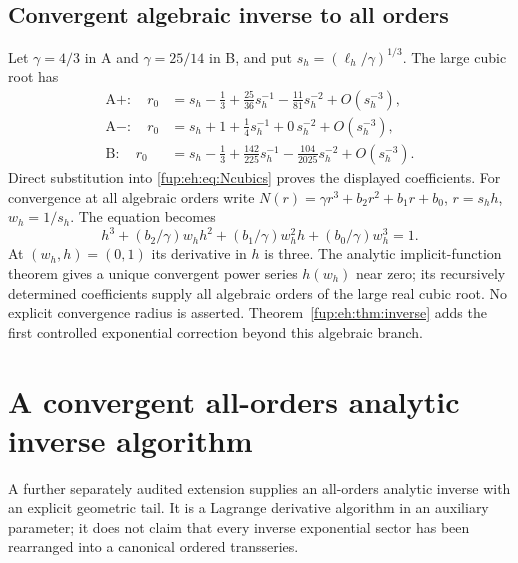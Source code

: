 \documentclass[11pt,letterpaper]{article}
\theoremstyle{definition}\newtheorem{definition}[theorem]{Definition}
\theoremstyle{remark}\newtheorem{remark}[theorem]{Remark}
\begin{document}
\subsection{Convergent algebraic inverse to all orders}
Let $\gamma=4/3$ in A and $\gamma=25/14$ in B, and put
$s_h=(\ell_h/\gamma)^{1/3}$. The large cubic root has
\begin{align*}
 \mathrm A+:\quad r_0&=s_h-\tfrac13+\tfrac{25}{36}s_h^{-1}
                         -\tfrac{11}{81}s_h^{-2}+O(s_h^{-3}),\\
 \mathrm A-:\quad r_0&=s_h+1+\tfrac14s_h^{-1}
                         +0\,s_h^{-2}+O(s_h^{-3}),\\
 \mathrm B:\quad r_0&=s_h-\tfrac13+\tfrac{142}{225}s_h^{-1}
                         -\tfrac{104}{2025}s_h^{-2}+O(s_h^{-3}).
\end{align*}
Direct substitution into \eqref{fup:eh:eq:Ncubics} proves the displayed
coefficients. For convergence at all algebraic orders write
$N(r)=\gamma r^3+b_2r^2+b_1r+b_0$, $r=s_h h$, $w_h=1/s_h$.
The equation becomes
\[
 h^3+(b_2/\gamma)w_hh^2+(b_1/\gamma)w_h^2h
 +(b_0/\gamma)w_h^3=1.
\]
At $(w_h,h)=(0,1)$ its derivative in $h$ is three. The analytic
implicit-function theorem gives a unique convergent power series
$h(w_h)$ near zero; its recursively determined coefficients supply
all algebraic orders of the large real cubic root. No explicit
convergence radius is asserted. Theorem~\ref{fup:eh:thm:inverse} adds the
first controlled exponential correction beyond this algebraic branch.

\section{A convergent all-orders analytic inverse algorithm}
\label{fup:eh:sec:allinverse}
A further separately audited extension \cite{fup:eh:allinverse,fup:eh:allaudit}
supplies an all-orders analytic inverse with an explicit geometric
tail. It is a Lagrange derivative algorithm in an auxiliary parameter;
it does not claim that every inverse exponential sector has been
rearranged into a canonical ordered transseries.
\end{document}
